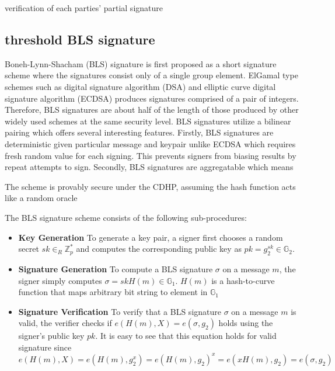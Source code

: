 \documentclass[11pt]{article}
\begin{document}
verification of each parties' partial signature

\subsection{threshold BLS signature}

Boneh-Lynn-Shacham (BLS) signature is first proposed as a short signature scheme where the signatures consist only of a single group element. ElGamal type schemes such as digital signature algorithm (DSA) and elliptic curve digital signature algorithm (ECDSA) produces signatures comprised of a pair of integers. Therefore, BLS signatures are about half of the length of those produced by other widely used schemes at the same security level\cite{menezes2009introduction}. BLS signatures utilize a bilinear pairing which offers several interesting features. Firstly, BLS signatures are deterministic given particular message and keypair unlike ECDSA which requires fresh random value for each signing. This prevents signers from biasing results by repeat attempts to sign. Secondly, BLS signatures are aggregatable which means 

The scheme is provably secure under the CDHP, assuming the hash function acts like a random oracle



The BLS signature scheme consists of the following sub-procedures:
\begin{itemize}
    \item[] \textbf{Key Generation} To generate a key pair, a signer first chooses a random secret $sk \in_R \mathbb{Z}_p^*$ and computes the corresponding public key as $pk = g_2^{sk} \in \mathbb{G}_2$.
    \item[] \textbf{Signature Generation} To compute a BLS signature $\sigma$ on a message $m$, the signer simply computes $\sigma = skH(m) \in \mathbb{G}_1$. $H(m)$ is a hash-to-curve function that maps arbitrary bit string to element in $\mathbb{G}_1$
    \item[] \textbf{Signature Verification} To verify that a BLS signature $\sigma$ on a message $m$ is valid, the verifier checks if $e(H(m),X)=e(\sigma,g_2)$ holds using the signer's public key $pk$. It is easy to see that this equation holds for valid signature since
    \begin{equation}
        e(H(m),X)=e(H(m),g_2^x)=e(H(m),g_2)^x=e(xH(m),g_2)=e(\sigma,g_2)
    \end{equation}
\end{itemize}
\end{document}
